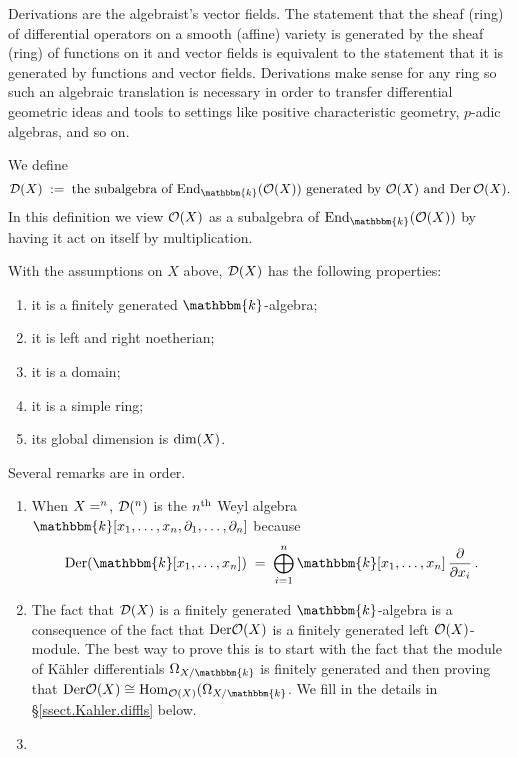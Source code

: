 \documentclass[12pt]{article}
\newcommand{\Bbbk}{\mathbbm{k}}
\let\AA\relax
\newcommand{\AA}{\bbA}
\begin{document}
Derivations are the algebraist's vector fields. The statement that the sheaf (ring) of differential operators on a smooth (affine) variety
is generated by the sheaf (ring) of functions on it and vector fields is equivalent to the statement that it is generated by functions and 
vector fields. Derivations make sense for any ring so such an algebraic translation is necessary in order to transfer
differential geometric ideas and tools to settings like positive characteristic geometry, $p$-adic algebras, and so on.



We define
$$
\calD(X) \;:=\; \text{the subalgebra of $\End_\Bbbk(\calO(X))$ generated by $\calO(X)$ and ${\rm Der}\, \calO(X)$}.
$$
In this definition we view $\mathcal{O}(X)$ as a subalgebra of $\End_\Bbbk(\calO(X))$ by having it act on itself by multiplication.

\begin{prop}
With the assumptions on $X$ above, $\mathcal{D}(X)$ has the following properties:
\begin{enumerate}
  \item 
  it is a finitely generated $\Bbbk$-algebra;
  \item 
  it is left and right noetherian;
  \item 
  it is a domain;
  \item
  it is a simple ring;
  \item
  its global dimension is ${\rm dim}(X)$.
\end{enumerate}
\end{prop}

Several remarks are in order. 
\begin{enumerate}
  \item 
  When $X=\AA^n$, $\calD(\AA^n)$ is the $n^{\rm th}$ Weyl algebra $\Bbbk[x_1,\ldots,x_n,\partial_1,\ldots,\partial_n]$ 
  because 
  $$
  {\rm Der}(\Bbbk[x_1,\ldots,x_n]) \;=\; \bigoplus_{i=1}^n \Bbbk[x_1,\ldots,x_n] \, \frac{\partial}{\partial x_i} \, .
  $$
  \item 
  The fact that $\mathcal{D}(X)$ is a finitely generated $\Bbbk$-algebra is a consequence of the fact that ${\rm Der} \mathcal{O}(X)$
  is a finitely generated left $\mathcal{O}(X)$-module. The best way to prove this is to start with the fact that the module of K\"ahler
  differentials $\Omega_{X/\Bbbk}$ is finitely generated and then proving that ${\rm Der} \calO(X) \cong
  \Hom_{\calO(X)}(\Omega_{X/\Bbbk}$. We fill in the details in \S\ref{ssect.Kahler.diffls} below.
  \item 
\end{enumerate}
\end{document}
